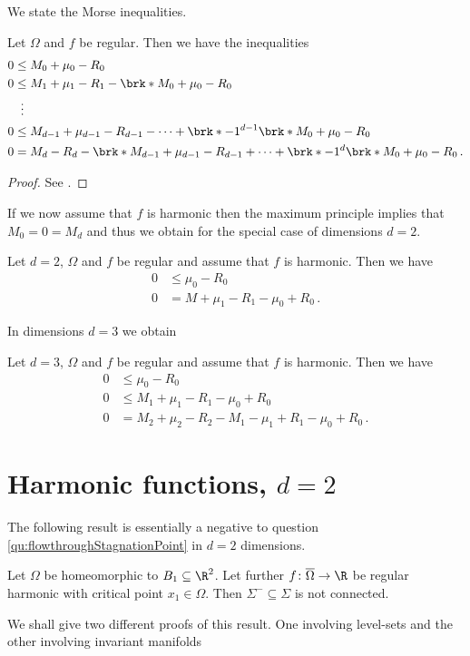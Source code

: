 We state the Morse inequalities.
\begin{theorem}
Let $\Omega$ and $f$ be regular. Then we have the inequalities
\begin{align*}
  0&\leq M_0+\mu_0-R_0\\
  0&\leq M_1+\mu_1-R_1-\brk*{M_0+\mu_0-R_0} \\
  &\;\;\vdots \\
  0&\leq M_{d-1}+\mu_{d-1}-R_{d-1}-\cdots +\brk*{-1}^{d-1}\brk*{M_0+\mu_0-R_0} \\
  0&=M_{d}-R_{d}-\brk*{M_{d-1}+\mu_{d-1}-R_{d-1}}+\cdots +\brk*{-1}^{d}\brk*{M_0+\mu_0-R_0}\,.
\end{align*}
\end{theorem}
\begin{proof}
  See \cite{Morse1969}.
\end{proof}
If we now assume that $f$ is harmonic then the maximum principle implies that
$M_0=0=M_d$ and thus we obtain for the special case of dimensions $d=2$.
\begin{corollary}[Morse inequalities for $f$ harmonic, $d=2$]
  Let $d=2$, $\Omega$ and $f$ be regular and assume that $f$ is harmonic. Then we have
  \begin{align*}
    0&\leq \mu_0-R_0 \\
    0&=M+\mu_1-R_1-\mu_0+R_0\,.
  \end{align*}
\end{corollary}
In dimensions $d=3$ we obtain
\begin{corollary}[Morse inequalities for $f$ harmonic, $d=3$]
  Let $d=3$, $\Omega$ and $f$ be regular and assume that $f$ is harmonic. Then we have
  \begin{align*}
    0&\leq \mu_0-R_0 \\
    0&\leq M_1+\mu_1-R_1-\mu_0+R_0 \\
    0&= M_2+\mu_2-R_2-M_1-\mu_1+R_1-\mu_0+R_0\,.
  \end{align*}
\end{corollary}

\newpage

\section{Harmonic functions, $d=2$}

The following result is essentially a negative to question \ref{qu:flowthroughStagnationPoint} in $d=2$ dimensions.
\begin{proposition}\label{pr:n2:hf:nonExistence}
  Let $\Omega$ be homeomorphic to $B_1\subseteq\R^2$. Let further $f\colon\overline{\Omega}\to\R$ be regular harmonic  
  with critical point $x_1\in\Omega$. Then $\Sigma^-\subseteq\Sigma$ is not connected.
\end{proposition}
We shall give two different proofs of this result. One involving level-sets and the other involving invariant manifolds

